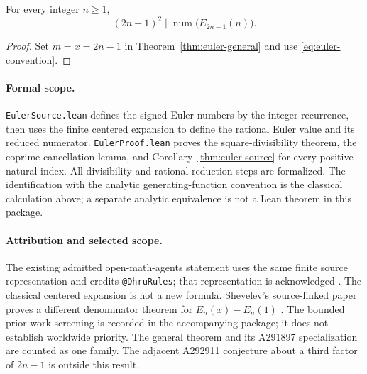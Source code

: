 \begin{corollary}\label{thm:euler-source}
For every integer $n\ge1$,
\[
 (2n-1)^2\mid\operatorname{num}\bigl(E_{2n-1}(n)\bigr).
\]
\end{corollary}

\begin{proof}
Set $m=x=2n-1$ in Theorem~\ref{thm:euler-general} and use
\eqref{eq:euler-convention}.
\end{proof}

\paragraph{Formal scope.}
\texttt{EulerSource.lean} defines the signed Euler numbers by the integer
recurrence, then uses the finite centered expansion to define the rational
Euler value and its reduced numerator. \texttt{EulerProof.lean} proves
the square-divisibility theorem, the coprime cancellation lemma, and
Corollary~\ref{thm:euler-source} for every positive natural index.
All divisibility and rational-reduction steps are formalized. The identification
with the analytic generating-function convention is the classical calculation
above; a separate analytic equivalence is not a Lean theorem in this package.

\paragraph{Attribution and selected scope.}
The existing admitted open-math-agents statement uses the same finite
source representation and credits \texttt{@DhruRules}; that representation
is acknowledged \cite{a291897-oma}. The classical centered expansion is
not a new formula. Shevelev's source-linked paper proves a different
denominator theorem for $E_n(x)-E_n(1)$ \cite{a291897-shevelev}.
The bounded prior-work screening is recorded in the accompanying package;
it does not establish worldwide priority. The general theorem and its
A291897 specialization are counted as one family. The adjacent
A292911 conjecture about a third factor of $2n-1$ is outside this result.
